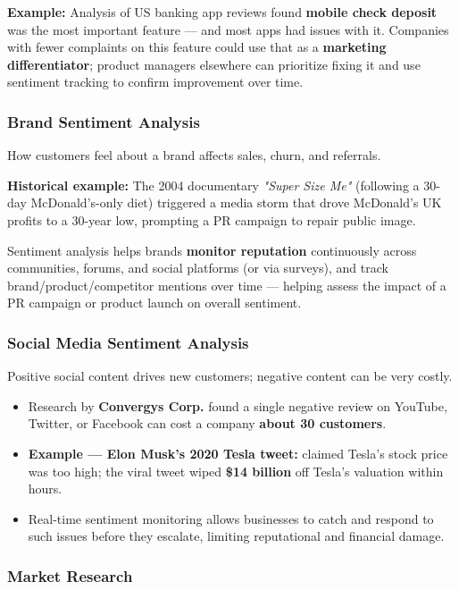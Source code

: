 \documentclass[12pt,openany]{book}
\begin{document}
\textbf{Example:} Analysis of US banking app reviews found \textbf{mobile check deposit} was the most important feature --- and most apps had issues with it. Companies with fewer complaints on this feature could use that as a \textbf{marketing differentiator}; product managers elsewhere can prioritize fixing it and use sentiment tracking to confirm improvement over time.

\subsubsection{Brand Sentiment Analysis}

How customers feel about a brand affects sales, churn, and referrals.

\textbf{Historical example:} The 2004 documentary \textit{"Super Size Me"} (following a 30-day McDonald's-only diet) triggered a media storm that drove McDonald's UK profits to a 30-year low, prompting a PR campaign to repair public image.

Sentiment analysis helps brands \textbf{monitor reputation} continuously across communities, forums, and social platforms (or via surveys), and track brand/product/competitor mentions over time --- helping assess the impact of a PR campaign or product launch on overall sentiment.

\subsubsection{Social Media Sentiment Analysis}

Positive social content drives new customers; negative content can be very costly.
\begin{itemize}[leftmargin=*]
    \item Research by \textbf{Convergys Corp.} found a single negative review on YouTube, Twitter, or Facebook can cost a company \textbf{about 30 customers}.
    \item \textbf{Example --- Elon Musk's 2020 Tesla tweet:} claimed Tesla's stock price was too high; the viral tweet wiped \textbf{\$14 billion} off Tesla's valuation within hours.
    \item Real-time sentiment monitoring allows businesses to catch and respond to such issues before they escalate, limiting reputational and financial damage.
\end{itemize}

\subsubsection{Market Research}
\end{document}
